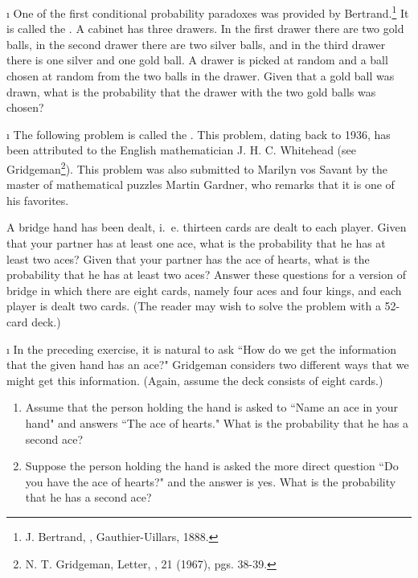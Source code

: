 \exercises
\begin{LJSItem}

\i\label{exer 4.3.1}
One of the first conditional probability paradoxes was
provided by Bertrand.\footnote{J. Bertrand, ,
Gauthier-Uillars, 1888.}  It is called the .  A cabinet has
three drawers. In the first drawer there  are two gold balls, in the second drawer  there are two
silver balls, and in the third drawer there  is one silver and one gold ball. A drawer is picked
at random and a ball chosen at random from the  two balls in the drawer.  Given that a  gold ball
was drawn, what is the probability that the drawer with the two gold balls was chosen?

\i\label{exer 4.3.2}
The following problem is called the . This problem,
dating back to 1936, has been attributed to the English mathematician J. H. C.
Whitehead (see Gridgeman\footnote{N. T. 
Gridgeman, Letter, , 21 (1967), pgs. 38-39.}). This problem was also
submitted to Marilyn vos Savant by the master of mathematical puzzles Martin
Gardner, who remarks that it is one of his favorites.
\par
A bridge hand has been dealt, i.\ e. thirteen cards are dealt to each player.  Given that
your partner has at least one ace, what is the probability that he has at least two aces?  Given that
your partner has the ace of hearts, what is the probability that he has at least two aces?  Answer these
questions for a version of bridge in which there are eight cards, namely four aces and four kings, and
each player is dealt two cards.  (The reader may wish to solve the problem with a 52-card deck.)

\i\label{exer 4.3.3}
In the preceding exercise, it is natural to ask ``How do we get the information that the given hand 
has an ace?" Gridgeman considers two different ways that we might get this information.  (Again, assume
the deck consists of eight cards.)
\begin{enumerate}
\item
Assume that the person holding the hand is asked to ``Name an ace in your hand" and answers ``The ace
of hearts."  What is the probability that he has a second ace?
\item
Suppose the person holding the hand is asked the more direct question ``Do you have the ace of
hearts?" and the answer is yes.  What is the probability that he has a second ace? 
\end{enumerate}


\end{LJSItem}
